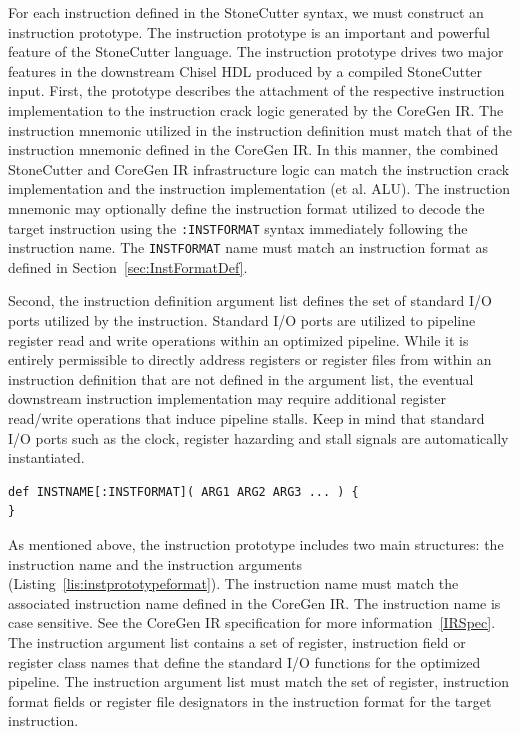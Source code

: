 \documentclass{article}
\begin{document}
For each instruction defined in the StoneCutter syntax, we must construct 
an instruction prototype.  The instruction prototype is an important and powerful 
feature of the StoneCutter language.  The instruction prototype drives two major 
features in the downstream Chisel HDL produced by a compiled StoneCutter input.  
First, the prototype describes the attachment of the respective instruction implementation 
to the instruction crack logic generated by the CoreGen IR.  The instruction mnemonic 
utilized in the instruction definition must match that of the instruction mnemonic defined 
in the CoreGen IR.  In this manner, the combined StoneCutter and CoreGen IR infrastructure 
logic can match the instruction crack implementation and the instruction implementation (et al. ALU).  
The instruction mnemonic may optionally define the instruction format utilized to decode the 
target instruction using the \texttt{:INSTFORMAT} syntax immediately following the instruction name.  
The \texttt{INSTFORMAT} name must match an instruction format as defined in Section~\ref{sec:InstFormatDef}.    

Second, the instruction definition argument list defines the set of standard I/O ports utilized by the 
instruction.  Standard I/O ports are utilized to pipeline register read and write operations within an 
optimized pipeline.  While it is entirely permissible to directly address registers or register files 
from within an instruction definition that are not defined in the argument list, the eventual downstream 
instruction implementation may require additional register read/write operations that induce pipeline 
stalls.  Keep in mind that standard I/O ports such as the clock, register hazarding and stall signals 
are automatically instantiated.  

\vspace{0.125in}
\begin{lstlisting}[frame=single,style=base,caption={Instruction Prototype Format},captionpos=b,label={lis:instprototypeformat}]
def INSTNAME[:INSTFORMAT]( ARG1 ARG2 ARG3 ... ) {
}
\end{lstlisting}

As mentioned above, the instruction prototype includes two main structures: the instruction 
name and the instruction arguments (Listing~\ref{lis:instprototypeformat}).  The instruction name must match the associated instruction 
name defined in the CoreGen IR.  The instruction name is case sensitive.  
See the CoreGen IR specification for more information~\ref{IRSpec}.  The instruction 
argument list contains a set of register, instruction field or register class names that define the standard I/O functions 
for the optimized pipeline.  The instruction argument list must match the set of register, instruction format fields or register file designators 
in the instruction format for the target instruction. 
  
\end{document}
